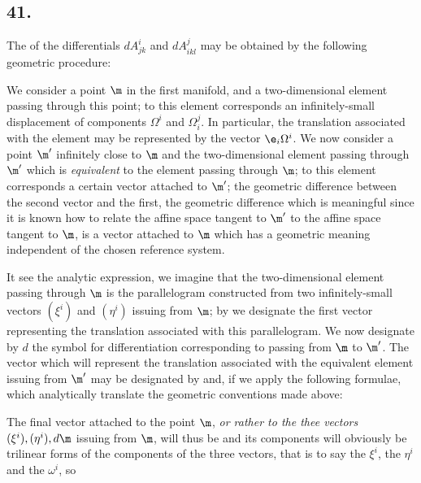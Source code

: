 \subsection*{41.}

The  of the differentials $dA_{jk}^i$ and $dA_{ikl}^j$ may be obtained by the following geometric procedure:

We consider a point $\m$ in the first manifold, and a two-dimensional element passing through this point; to this element corresponds an infinitely-small displacement of components $\Omega^i$ and $\Omega_i^j$. In particular, the translation associated with the element may be represented by the vector $\e_i\Omega^i$. We now consider a point $\m'$ infinitely close to $\m$ and the two-dimensional element passing through $\m'$ which is \textit{equivalent} to the element passing through $\m$; to this element corresponds a certain vector attached to $\m'$; the geometric difference between the second vector and the first, the geometric difference which is meaningful since it is known how to relate the affine space tangent to $\m'$ to the affine space tangent to $\m$, is a vector attached to $\m$ which has a geometric meaning independent of the chosen reference system.

It see the analytic expression, we imagine that the two-dimensional element passing through $\m$ is the parallelogram constructed from two infinitely-small vectors $(\xi^i)$ and $(\eta^i)$ issuing from $\m$; by
we designate the first vector representing the translation associated with this parallelogram. We now designate by $d$ the symbol for differentiation corresponding to passing from $\m$ to $\m'$. The vector which will represent the translation associated with the equivalent element issuing from $\m'$ may be designated by
and, if we apply the following formulae, which analytically translate the geometric conventions made above:

The final vector attached to the point $\m$, \textit{or rather to the thee vectors $(\xi^i), (\eta^i), d\m$} issuing from $\m$, will thus be
and its components will obviously be trilinear forms of the components of the three vectors, that is to say the $\xi^i$, the $\eta^i$ and the $\omega^i$, so

